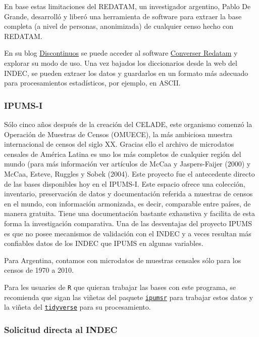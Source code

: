 \documentclass[
]{article}
\begin{document}
En base estas limitaciones del REDATAM, un investigador argentino, Pablo De Grande, desarrolló y liberó una herramienta de software para extraer la base completa (a nivel de personas, anonimizada) de cualquier censo hecho con REDATAM.

En su blog \href{https://idiscontinuos.wordpress.com/2015/03/21/convirtiendo-bases-redatam-a-spss/}{Discontinuos} se puede acceder al software \href{https://www.aacademica.org/conversor.redatam}{Converser Redatam} y explorar su modo de uso. Una vez bajados los diccionarios desde la web del INDEC, se pueden extraer los datos y guardarlos en un formato más adecuado para procesamientos estadísticos, por ejemplo, en ASCII.

\hypertarget{ipums-i}{%
\subsubsection{IPUMS-I}\label{ipums-i}}

Sólo cinco años después de la creación del CELADE, este organismo comenzó la Operación de Muestras de Censos (OMUECE), la más ambiciosa muestra internacional de censos del siglo XX. Gracias ello el archivo de microdatos censales de América Latina es uno los más completos de cualquier región del mundo (para más información ver artículos de McCaa y Jaspers-Faijer (2000) y McCaa, Esteve, Ruggles y Sobek (2004). Este proyecto fue el antecedente directo de las bases disponibles hoy en el IPUMS-I. Este espacio ofrece una colección, inventario, preservación de datos y documentación referida a muestras de censos en el mundo, con información armonizada, es decir, comparable entre países, de manera gratuita. Tiene una documentación bastante exhaustiva y facilita de esta forma la investigación comparativa. Una de las desventajas del proyecto IPUMS es que no posee mecanismos de validación con el INDEC y a veces resultan más confiables datos de los INDEC que IPUMS en algunas variables.

Para Argentina, contamos con microdatos de muestras censales sólo para los censos de 1970 a 2010.

Para les usuaries de \texttt{R} que quieran trabajar las bases con este programa, se recomienda que sigan las viñetas del paquete \href{https://cran.r-project.org/web/packages/ipumsr/vignettes/ipums.html}{\texttt{ipumsr}} para trabajar estos datos y la viñeta del \href{https://www.tidyverse.org/}{\texttt{tidyverse}} para su procesamiento.

\hypertarget{solicitud-directa-al-indec}{%
\subsubsection{Solicitud directa al INDEC}\label{solicitud-directa-al-indec}}
\end{document}
